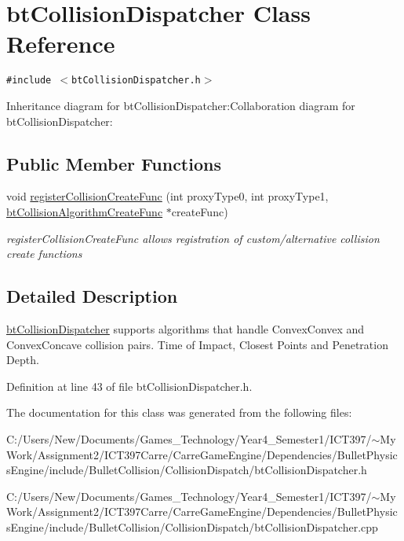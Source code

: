 \hypertarget{classbt_collision_dispatcher}{
\section{btCollisionDispatcher Class Reference}
\label{classbt_collision_dispatcher}
}
{\tt \#include $<$btCollisionDispatcher.h$>$}

Inheritance diagram for btCollisionDispatcher:Collaboration diagram for btCollisionDispatcher:\subsection*{Public Member Functions}
\begin{CompactItemize}
\item 
\hypertarget{classbt_collision_dispatcher_c754ecadc2116cdf75d63c207937aeac}{
void \hyperlink{classbt_collision_dispatcher_c754ecadc2116cdf75d63c207937aeac}{registerCollisionCreateFunc} (int proxyType0, int proxyType1, \hyperlink{structbt_collision_algorithm_create_func}{btCollisionAlgorithmCreateFunc} $\ast$createFunc)}
\label{classbt_collision_dispatcher_c754ecadc2116cdf75d63c207937aeac}

\begin{CompactList}\small\item\em registerCollisionCreateFunc allows registration of custom/alternative collision create functions \item\end{CompactList}\end{CompactItemize}


\subsection{Detailed Description}
\hyperlink{classbt_collision_dispatcher}{btCollisionDispatcher} supports algorithms that handle ConvexConvex and ConvexConcave collision pairs. Time of Impact, Closest Points and Penetration Depth. 

Definition at line 43 of file btCollisionDispatcher.h.

The documentation for this class was generated from the following files:\begin{CompactItemize}
\item 
C:/Users/New/Documents/Games\_\-Technology/Year4\_\-Semester1/ICT397/$\sim$My Work/Assignment2/ICT397Carre/CarreGameEngine/Dependencies/BulletPhysicsEngine/include/BulletCollision/CollisionDispatch/btCollisionDispatcher.h\item 
C:/Users/New/Documents/Games\_\-Technology/Year4\_\-Semester1/ICT397/$\sim$My Work/Assignment2/ICT397Carre/CarreGameEngine/Dependencies/BulletPhysicsEngine/include/BulletCollision/CollisionDispatch/btCollisionDispatcher.cpp\end{CompactItemize}
